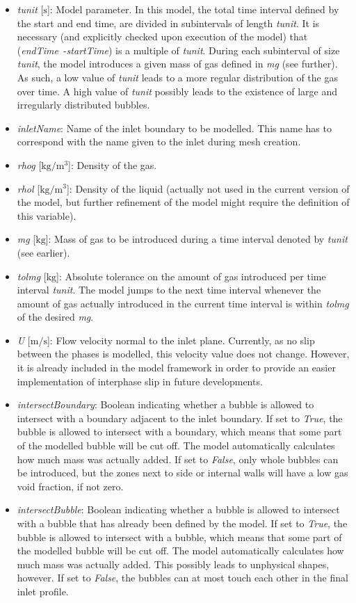 \documentclass[fleqn,10pt,a4paper,twoside,english]{book}
\begin{document}
\begin{itemize}
	\item{\textit{tunit} [$\mathrm{s}$]: Model parameter. In this model, the total time interval defined by the start and end time, are divided in subintervals of length \textit{tunit}. It is necessary (and explicitly checked upon execution of the model) that \mbox{(\textit{endTime} -\textit{startTime})} is a multiple of \textit{tunit}. During each subinterval of size \textit{tunit}, the model introduces a given mass of gas defined in \textit{mg} (see further). As such, a low value of \textit{tunit} leads to a more regular distribution of the gas over time. A high value of \textit{tunit} possibly leads to the existence of large and irregularly distributed bubbles. }
	\item{\textit{inletName}: Name of the inlet boundary to be modelled. This name has to correspond with the name given to the inlet during mesh creation.}
	\item{\textit{rhog} [$\mathrm{kg/m^3}$]: Density of the gas. }
	\item{\textit{rhol} [$\mathrm{kg/m^3}$]: Density of the liquid (actually not used in the current version of the model, but further refinement of the model might require the definition of this variable). }
	\item{\textit{mg} [$\mathrm{kg}$]: Mass of gas to be introduced during a time interval denoted by \textit{tunit} (see earlier). }
	\item{\textit{tol\textunderscore mg} [$\mathrm{kg}$]: Absolute tolerance on the amount of gas introduced per time interval \textit{tunit}. The model jumps to the next time interval whenever the amount of gas actually introduced in the current time interval is within \textit{tol\textunderscore mg} of the desired \textit{mg}. }
	\item{\textit{U} [$\mathrm{m/s}$]: Flow velocity normal to the inlet plane. Currently, as no slip between the phases is modelled, this velocity value does not change. However, it is already included in the model framework in order to provide an easier implementation of interphase slip in future developments. }
	\item{\textit{intersectBoundary}: Boolean indicating whether a bubble is allowed to intersect with a boundary adjacent to the inlet boundary. If set to \textit{True}, the bubble is allowed to intersect with a boundary, which means that some part of the modelled bubble will be cut off. The model automatically calculates how much mass was actually added. If set to \textit{False}, only whole bubbles can be introduced, but the zones next to side or internal walls will have a low gas void fraction, if not zero.}
	\item{\textit{intersectBubble}: Boolean indicating whether a bubble is allowed to intersect with a bubble that has already been defined by the model. If set to \textit{True}, the bubble is allowed to intersect with a bubble, which means that some part of the modelled bubble will be cut off. The model automatically calculates how much mass was actually added. This possibly leads to unphysical shapes, however. If set to \textit{False}, the bubbles can at most touch each other in the final inlet profile. }
\end{itemize}
\end{document}
